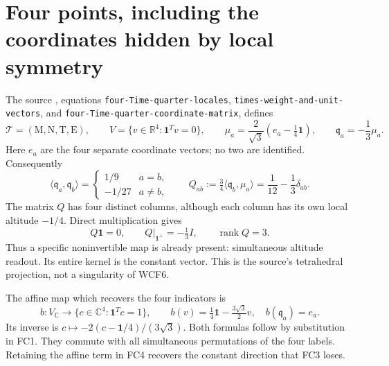 \documentclass[11pt]{article}
\newcommand{\C}{\mathbb C}
\newcommand{\R}{\mathbb R}
\newcommand{\rank}{\operatorname{rank}}
\begin{document}
\section{Four points, including the coordinates hidden by local symmetry}
The source \cite{ES}, equations \texttt{four-Time-quarter-locales},
\texttt{times-weight-and-unit-vectors}, and
\texttt{four-Time-quarter-coordinate-matrix}, defines
\[
 \mathcal T=(\mathrm M,\mathrm N,\mathrm T,\mathrm E),\qquad
 V=\{v\in\R^4:\mathbf1^Tv=0\},\qquad
 \mu_a=\frac2{\sqrt3}(e_a-\tfrac14\mathbf1),\qquad
 \mathfrak q_a=-\frac13\mu_a.
 \tag{FC1}
\]
Here $e_a$ are the four separate coordinate vectors; no two are identified.
Consequently
\[
 \langle\mathfrak q_a,\mathfrak q_b\rangle
 =\begin{cases}1/9&a=b,\\-1/27&a\ne b,\end{cases}
 \qquad
 Q_{ab}:=\tfrac34\langle\mathfrak q_b,\mu_a\rangle
 =\frac1{12}-\frac13\delta_{ab}.
 \tag{FC2}
\]
The matrix $Q$ has four distinct columns, although each column has its
own local altitude $-1/4$. Direct multiplication gives
\[
 Q\mathbf1=0,\qquad Q|_{\mathbf1^\perp}=-\tfrac13 I,
 \qquad \rank Q=3.
 \tag{FC3}
\]
Thus a specific noninvertible map is already present: simultaneous
altitude readout. Its entire kernel is the constant vector. This is the
source's tetrahedral projection, not a singularity of WCF6.

The affine map which recovers the four indicators is
\[
 b:V_{\C}\longrightarrow\{c\in\C^4:\mathbf1^Tc=1\},\qquad
 b(v)=\tfrac14\mathbf1-\tfrac{3\sqrt3}{2}v,
 \quad b(\mathfrak q_a)=e_a.
 \tag{FC4}
\]
Its inverse is $c\mapsto-2(c-\mathbf1/4)/(3\sqrt3)$.
Both formulas follow by substitution in FC1. They commute with all
simultaneous permutations of the four labels. Retaining the affine term
in FC4 recovers the constant direction that FC3 loses.
\end{document}
